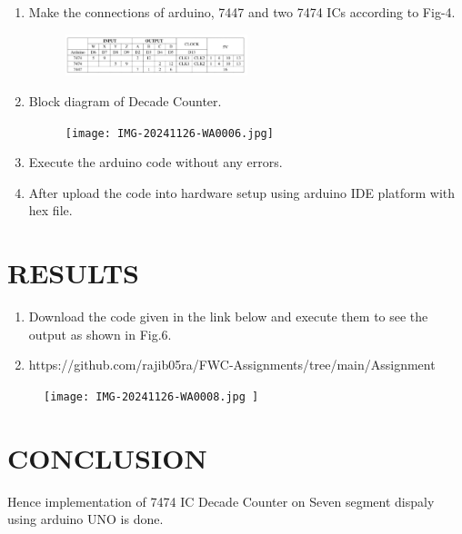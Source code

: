 \documentclass[conference]{IEEEtran}
\begin{document}
\begin{enumerate}

\item Make the connections of arduino, 7447 and two 7474 ICs according to Fig-4.
	\begin{figure}[h] 
	\centering 
	\includegraphics[width=0.5\textwidth]{IMG-20241126-WA0007.jpg     }
	\caption{\label{fig-4:Gates}}    
\end{figure}

\item Block diagram of Decade Counter.

\begin{figure}[h]                           
\centering                                 
\texttt{[image:  IMG-20241126-WA0006.jpg]}                                           
\caption{\label{fig-5:Gates}}               
\end{figure}


	
\item Execute the arduino code without any errors.
\item After upload the code into hardware setup using arduino IDE platform with hex file.
 \end{enumerate}

\section{RESULTS}
 \begin{enumerate}
	 \item Download the code given in the link below and execute them to see the output as shown in Fig.6. 
	 \item https://github.com/rajib05ra/FWC-Assignments/tree/main/Assignment%
 \end{enumerate}
		 \begin{figure}[h] 
	\centering 
	\texttt{[image: IMG-20241126-WA0008.jpg    ]}
	\caption{\label{fig-6:Gates}}    
\end{figure}
\section{CONCLUSION}
Hence implementation of 7474 IC Decade Counter on Seven segment dispaly using arduino UNO is done.
\end{document}
